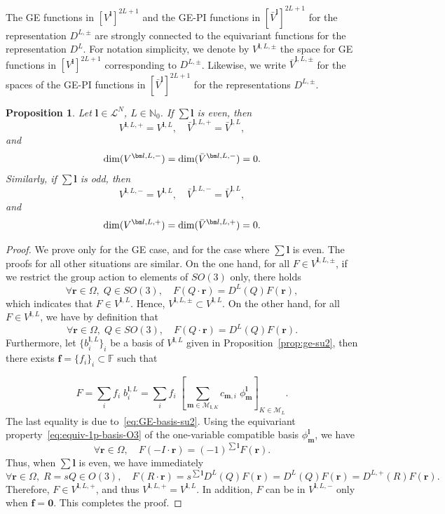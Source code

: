 \documentclass{article}
\newcommand{\bV}{{\bar V}}
\newcommand{\dimge}[2]{\dim(V^{#1,#2})}
\newcommand{\dimpi}[2]{\dim(\bV^{#1,#2})}
\newtheorem{proposition}[theorem]{Proposition}
\numberwithin{equation}{section}
\def\N{\mathbb{N}}
\def\F{\mathbb{F}}
\def\br{{\bm r}}
\def\bl{{\bm l}}
\def\bbm{{\bm m}}
\def\calM{\mathcal{M}}
\def\calL{\mathcal{L}}
\def\dim{{{\rm dim}}}
\begin{document}
The GE functions in $\left[V^\bl\right]^{2L+1}$ and the GE-PI functions in $\left[\bV^\bl\right]^{2L+1}$ for the representation $D^{L,\pm}$ are strongly connected to the equivariant functions for the representation $D^{L}$. For notation simplicity, we denote by $V^{\bl,L,\pm}$ the space for GE functions in $\left[V^\bl\right]^{2L+1}$ corresponding to $D^{L,\pm}$. Likewise, we write $\bV^{\bl,L,\pm}$ for the spaces of the GE-PI functions in $\left[\bV^\bl\right]^{2L+1}$ for the representations $D^{L,\pm}$. 

\begin{proposition}\label{eq:equiv-basis-o3}
    Let $\bl\in\calL^N$, $L \in \N_0$. If $\sum\bl$ is even, then
    \[
        V^{\bl,L,+} = V^{\bl,L}, \quad \bV^{\bl,L,+} = \bV^{\bl,L}, 
    \]
    and
    \[  
        \dimge{\bl}{L,-} = \dimpi{\bl}{L,-}=0.
    \]
    Similarly, if $\sum\bl$ is odd, then
    \[
        V^{\bl,L,-} = V^{\bl,L}, \quad \bV^{\bl,L,-} = \bV^{\bl,L},
    \]
    and
    \[  
        \dimge{\bl}{L,+} = \dimpi{\bl}{L,+}=0.
    \]
\end{proposition}
\begin{proof}
We prove only for the GE case, and for the case where $\sum\bl$ is even. The proofs for all other situations are similar. 
On the one hand, for all $F\in V^{\bl,L,\pm}$, if we restrict the group action to elements of $SO(3)$ only, there holds 
\[
    \forall \br\in\Omega, \;  Q\in SO(3), \quad F(Q\cdot\br) = D^L(Q) F(\br),
\]
which indicates that $F\in V^{\bl,L}$. Hence, $V^{\bl,L,\pm}\subset V^{\bl,L}$.
On the other hand, for all $F\in V^{\bl,L}$, we have by definition that
\[
    \forall \br\in\Omega, \;  Q\in SO(3), \quad F(Q\cdot\br) = D^L(Q) F(\br).
\]
Furthermore, let $\{b^{\bl,L}_i\}_i$ be a basis of $V^{\bl,L}$ given in Proposition~\ref{prop:ge-su2}, then there exists $\mathbf{f}=\{f_i\}_i\subset\F$ such that 

\[
    F 
    = \sum_i f_i \; b^{\bl,L}_{i} 
    = \sum_i f_i \; \left[
        \sum_{\bbm \in \calM_{\bl,K}}c_{\bbm,i}
        \; \phi^\bl_\bbm
    \right]_{K\in\calM_L}.
\]
The last equality is due to~\eqref{eq:GE-basis-su2}. Using the equivariant property~\eqref{eq:equiv-1p-basis-O3} of the one-variable compatible basis $\phi^\bl_\bbm$, we have
\[
    \forall \br\in\Omega, \quad  F(-I\cdot\br) = (-1)^{\sum\bl} F(\br). 
\]
Thus, when $\sum\bl$ is even, we have immediately
\[
    \forall \br\in\Omega, \;  R=sQ\in O(3), \quad F(R\cdot\br) = s^{\sum\bl} D^L(Q) F(\br) = D^L(Q) F(\br) = D^{L,+}(R) F(\br).
\]
Therefore, $F\in V^{\bl,L,+}$, and thus $V^{\bl,L,+}=V^{\bl,L}$. In addition, $F$ can be in $V^{\bl,L,-}$ only when $\mathbf{f}=\mathbf{0}$. This completes the proof. 
\end{proof}
\end{document}
